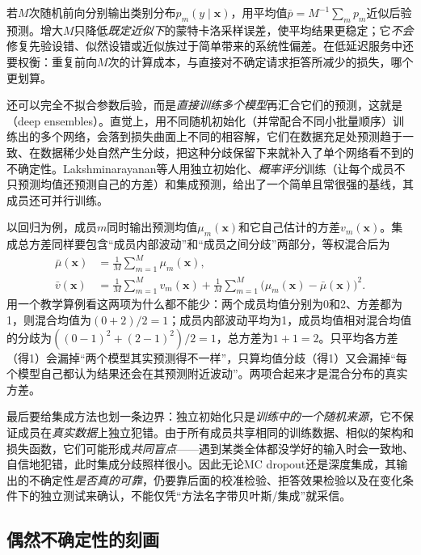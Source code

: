 若$M$次随机前向分别输出类别分布$p_m(y\mid\bm{x})$，用平均值$\bar p=M^{-1}\sum_m p_m$近似后验预测。增大$M$只降低\emph{既定近似下}的蒙特卡洛采样误差，使平均结果更稳定；它\emph{不会}修复先验设错、似然设错或近似族过于简单带来的系统性偏差。在低延迟服务中还要权衡：重复前向$M$次的计算成本，与直接对不确定请求拒答所减少的损失，哪个更划算。

还可以完全不拟合参数后验，而是\emph{直接训练多个模型}再汇合它们的预测，这就是（deep ensembles）。直觉上，用不同随机初始化（并常配合不同小批量顺序）训练出的多个网络，会落到损失曲面上不同的相容解，它们在数据充足处预测趋于一致、在数据稀少处自然产生分歧，把这种分歧保留下来就补入了单个网络看不到的不确定性。Lakshminarayanan等人用独立初始化、\emph{概率评分}训练（让每个成员不只预测均值还预测自己的方差）和集成预测，给出了一个简单且常很强的基线，其成员还可并行训练。

以回归为例，成员$m$同时输出预测均值$\mu_m(\bm{x})$和它自己估计的方差$v_m(\bm{x})$。集成总方差同样要包含“成员内部波动”和“成员之间分歧”两部分，等权混合后为
\begin{equation}
 \begin{aligned}
 \bar\mu(\bm{x})&=\frac1M\sum_{m=1}^{M}\mu_m(\bm{x}),\\
 \bar v(\bm{x})&=\frac1M\sum_{m=1}^{M}v_m(\bm{x})
  +\frac1M\sum_{m=1}^{M}
       \bigl(\mu_m(\bm{x})-\bar\mu(\bm{x})\bigr)^2.
 \end{aligned}
 \label{eq:reliability-ensemble-variance}
\end{equation}
用一个教学算例看这两项为什么都不能少：两个成员均值分别为0和2、方差都为1，则混合均值为$(0+2)/2=1$；成员内部波动平均为1，成员均值相对混合均值的分歧为$((0-1)^2+(2-1)^2)/2=1$，总方差为$1+1=2$。只平均各方差（得1）会漏掉“两个模型其实预测得不一样”，只算均值分歧（得1）又会漏掉“每个模型自己都认为结果还会在其预测附近波动”。两项合起来才是混合分布的真实方差。

最后要给集成方法也划一条边界：独立初始化只是\emph{训练中的一个随机来源}，它不保证成员在\emph{真实数据}上独立犯错。由于所有成员共享相同的训练数据、相似的架构和损失函数，它们可能形成\emph{共同盲点}——遇到某类全体都没学好的输入时会一致地、自信地犯错，此时集成分歧照样很小。因此无论MC dropout还是深度集成，其输出的不确定性\emph{是否真的可靠}，仍要靠后面的校准检验、拒答效果检验以及在变化条件下的独立测试来确认，不能仅凭“方法名字带贝叶斯/集成”就采信。

\subsection{偶然不确定性的刻画}
\label{sec:reliability-aleatoric-estimation}

